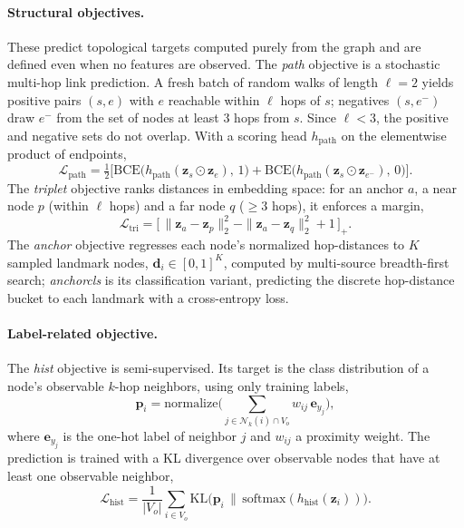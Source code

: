 \paragraph{Structural objectives.} These predict topological targets computed purely from the graph and are defined even when no features are observed.
The \emph{path} objective is a stochastic multi-hop link prediction. A fresh batch of random walks of length $\ell=2$ yields positive pairs $(s,e)$ with $e$ reachable within $\ell$ hops of $s$; negatives $(s,e^-)$ draw $e^-$ from the set of nodes at least $3$ hops from $s$. Since $\ell<3$, the positive and negative sets do not overlap. With a scoring head $h_{\text{path}}$ on the elementwise product of endpoints,
\begin{equation}
    \mathcal{L}_{\text{path}} = \tfrac{1}{2}\Big[
        \mathrm{BCE}\big(h_{\text{path}}(\mathbf{z}_s\!\odot\!\mathbf{z}_e),\,1\big)
        + \mathrm{BCE}\big(h_{\text{path}}(\mathbf{z}_s\!\odot\!\mathbf{z}_{e^-}),\,0\big)
    \Big].
\end{equation}
The \emph{triplet} objective ranks distances in embedding space: for an anchor $a$, a near node $p$ (within $\ell$ hops) and a far node $q$ ($\geq 3$ hops), it enforces a margin,
\begin{equation}
    \mathcal{L}_{\text{tri}} = \big[\,\|\mathbf{z}_a-\mathbf{z}_p\|_2^2 - \|\mathbf{z}_a-\mathbf{z}_q\|_2^2 + 1\,\big]_+ .
\end{equation}
The \emph{anchor} objective regresses each node's normalized hop-distances to $K$ sampled landmark nodes, $\mathbf{d}_i\in[0,1]^K$, computed by multi-source breadth-first search; \emph{anchorcls} is its classification variant, predicting the discrete hop-distance bucket to each landmark with a cross-entropy loss.

\paragraph{Label-related objective.} The \emph{hist} objective is semi-supervised. Its target is the class distribution of a node's observable $k$-hop neighbors, using only training labels,
\begin{equation}
    \mathbf{p}_i = \mathrm{normalize}\Big(\sum_{j\in\mathcal{N}_k(i)\cap V_o} w_{ij}\,\mathbf{e}_{y_j}\Big),
\end{equation}
where $\mathbf{e}_{y_j}$ is the one-hot label of neighbor $j$ and $w_{ij}$ a proximity weight. The prediction is trained with a KL divergence over observable nodes that have at least one observable neighbor,
\begin{equation}
    \mathcal{L}_{\text{hist}} = \frac{1}{|V_o|}\sum_{i\in V_o} \mathrm{KL}\big(\mathbf{p}_i \,\|\, \mathrm{softmax}(h_{\text{hist}}(\mathbf{z}_i))\big).
\end{equation}

